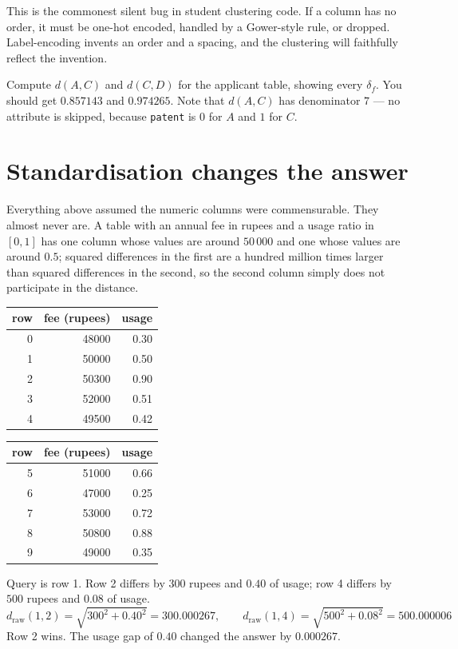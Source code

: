 \documentclass[11pt]{article}
\begin{document}
\begin{caution}
This is the commonest silent bug in student clustering code. If a column has
no order, it must be one-hot encoded, handled by a Gower-style rule, or
dropped. Label-encoding invents an order and a spacing, and the clustering
will faithfully reflect the invention.
\end{caution}

\begin{tryit}
Compute $d(A,C)$ and $d(C,D)$ for the applicant table, showing every
$\delta_f$. You should get $0.857143$ and $0.974265$. Note that $d(A,C)$
has denominator $7$ --- no attribute is skipped, because \texttt{patent}
is $0$ for $A$ and $1$ for $C$.
\end{tryit}

\section{Standardisation changes the answer}
\label{sec:standard}

Everything above assumed the numeric columns were commensurable. They almost
never are. A table with an annual fee in rupees and a usage ratio in $[0,1]$
has one column whose values are around $50\,000$ and one whose values are
around $0.5$; squared differences in the first are a hundred million times
larger than squared differences in the second, so the second column simply
does not participate in the distance.

\begin{worked}
\begin{center}
\begin{tabular}{rrr}
  \toprule
  row & fee (rupees) & usage \\ \midrule
  0 & 48000 & 0.30 \\
  1 & 50000 & 0.50 \\
  2 & 50300 & 0.90 \\
  3 & 52000 & 0.51 \\
  4 & 49500 & 0.42 \\
  \bottomrule
\end{tabular}
\qquad
\begin{tabular}{rrr}
  \toprule
  row & fee (rupees) & usage \\ \midrule
  5 & 51000 & 0.66 \\
  6 & 47000 & 0.25 \\
  7 & 53000 & 0.72 \\
  8 & 50800 & 0.88 \\
  9 & 49000 & 0.35 \\
  \bottomrule
\end{tabular}
\end{center}
Query is row 1. Row 2 differs by $300$ rupees and $0.40$ of usage;
row 4 differs by $500$ rupees and $0.08$ of usage.
\[
  d_{\text{raw}}(1,2) = \sqrt{300^2 + 0.40^2} = 300.000267, \qquad
  d_{\text{raw}}(1,4) = \sqrt{500^2 + 0.08^2} = 500.000006
\]
Row 2 wins. The usage gap of $0.40$ changed the answer by $0.000267$.
\end{worked}
\end{document}
